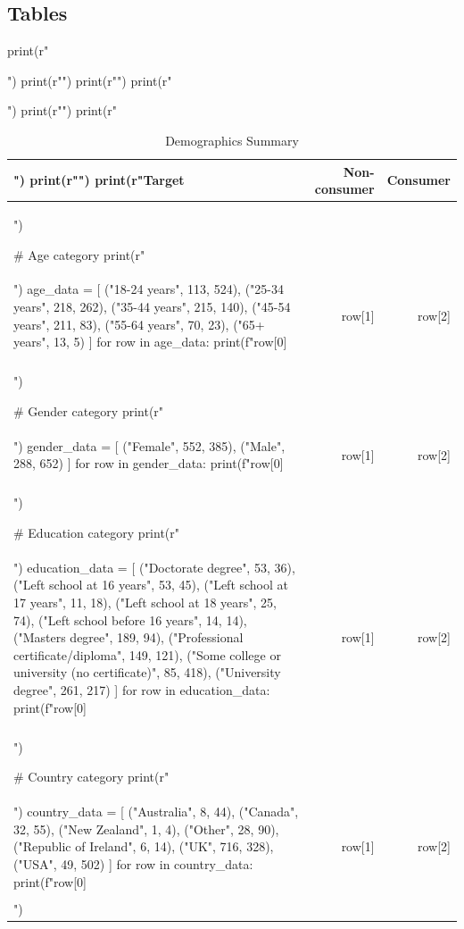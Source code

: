 \documentclass{article}
\begin{document}
\subsection*{Tables}
\begin{pycode}
print(r"\begin{table}[h!]")
print(r"\centering")
print(r"\small")
print(r"\caption{Demographics Summary}")
print(r"\label{tab:summary-demographic}")
print(r"\begin{tabular}{|l|r|r|}")
print(r"\hline")
print(r"\textbf{Target} & \textbf{Non-consumer} & \textbf{Consumer} \\ \hline")

# Age category
print(r"\multicolumn{3}{|l|}{\textbf{Age category}} \\ \hline")
age_data = [
    ("18-24 years", 113, 524),
    ("25-34 years", 218, 262),
    ("35-44 years", 215, 140),
    ("45-54 years", 211, 83),
    ("55-64 years", 70, 23),
    ("65+ years", 13, 5)
    ]
for row in age_data:
    print(f"{row[0]} & {row[1]} & {row[2]} \\\\ \hline")

# Gender category
print(r"\multicolumn{3}{|l|}{\textbf{Gender category}} \\ \hline")
gender_data = [
    ("Female", 552, 385),
    ("Male", 288, 652)
    ]
for row in gender_data:
    print(f"{row[0]} & {row[1]} & {row[2]} \\\\ \hline")

# Education category
print(r"\multicolumn{3}{|l|}{\textbf{Education category}} \\ \hline")
education_data = [
    ("Doctorate degree", 53, 36),
    ("Left school at 16 years", 53, 45),
    ("Left school at 17 years", 11, 18),
    ("Left school at 18 years", 25, 74),
    ("Left school before 16 years", 14, 14),
    ("Masters degree", 189, 94),
    ("Professional certificate/diploma", 149, 121),
    ("Some college or university (no certificate)", 85, 418),
    ("University degree", 261, 217)
    ]
for row in education_data:
    print(f"{row[0]} & {row[1]} & {row[2]} \\\\ \hline")

# Country category
print(r"\multicolumn{3}{|l|}{\textbf{Country category}} \\ \hline")
country_data = [
    ("Australia", 8, 44),
    ("Canada", 32, 55),
    ("New Zealand", 1, 4),
    ("Other", 28, 90),
    ("Republic of Ireland", 6, 14),
    ("UK", 716, 328),
    ("USA", 49, 502)
    ]
for row in country_data:
    print(f"{row[0]} & {row[1]} & {row[2]} \\\\ \hline")


\end{tabular}
\end{table}
\end{pycode}
\end{document}
